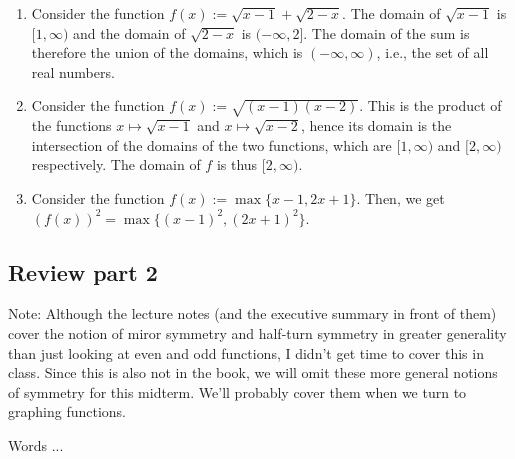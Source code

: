 \documentclass[10pt]{amsart}
\begin{document}
\begin{enumerate}
\item Consider the function $f(x) := \sqrt{x - 1} + \sqrt{2 - x}$. The
  domain of $\sqrt{x - 1}$ is $[1,\infty)$ and the domain of $\sqrt{2
  - x}$ is $(-\infty,2]$. The domain of the sum is therefore the union
  of the domains, which is $(-\infty,\infty)$, i.e., the set of all
  real numbers.
\item Consider the function $f(x) := \sqrt{(x - 1)(x - 2)}$. This is
  the product of the functions $x \mapsto \sqrt{x - 1}$ and $x \mapsto
  \sqrt{x - 2}$, hence its domain is the intersection of the domains
  of the two functions, which are $[1,\infty)$ and $[2,\infty)$
  respectively. The domain of $f$ is thus $[2,\infty)$.
\item Consider the function $f(x) := \max \{ x - 1, 2x + 1 \}$. Then,
  we get $(f(x))^2 = \max \{ (x - 1)^2, (2x + 1)^2 \}$.
\end{enumerate}

\subsection{Review part 2}

Note: Although the lecture notes (and the executive summary in front
of them) cover the notion of miror symmetry and half-turn symmetry in
greater generality than just looking at even and odd functions, I
didn't get time to cover this in class. Since this is also not in the
book, we will omit these more general notions of symmetry for this
midterm. We'll probably cover them when we turn to graphing functions.

Words ...
\end{document}
